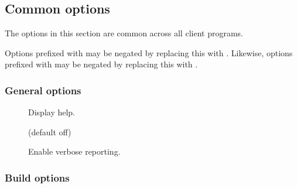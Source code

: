 \subsection{Common options\label{Common_options}}

The options in this section are common across all client programs.

Options prefixed with  may be negated by replacing this with
. Likewise, options prefixed with  may be negated
by replacing this with .

\subsubsection{General options}

\begin{description}
\item[]

Display help.

\item[] (default off)

Enable verbose reporting.
\end{description}

\subsubsection{Build options}

